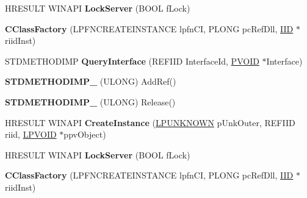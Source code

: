 \begin{DoxyCompactItemize}
\item 
\mbox{\label{class_c_class_factory_ab456aeb3f6ba2d246532a370b69ee471}} 
H\+R\+E\+S\+U\+LT W\+I\+N\+A\+PI {\bfseries Lock\+Server} (B\+O\+OL f\+Lock)
\item 
\mbox{\label{class_c_class_factory_ab0b65f2f3ae9421cc7a8d67962920bc5}} 
{\bfseries C\+Class\+Factory} (L\+P\+F\+N\+C\+R\+E\+A\+T\+E\+I\+N\+S\+T\+A\+N\+CE lpfn\+CI, P\+L\+O\+NG pc\+Ref\+Dll, \hyperlink{struct___i_i_d}{I\+ID} $\ast$riid\+Inst)
\item 
\mbox{\label{class_c_class_factory_a3521365dd055a10b8ff989c16a42bd8f}} 
S\+T\+D\+M\+E\+T\+H\+O\+D\+I\+MP {\bfseries Query\+Interface} (R\+E\+F\+I\+ID Interface\+Id, \hyperlink{interfacevoid}{P\+V\+O\+ID} $\ast$Interface)
\item 
\mbox{\label{class_c_class_factory_a769e4e226363663e0854552a3bda45cc}} 
{\bfseries S\+T\+D\+M\+E\+T\+H\+O\+D\+I\+M\+P\+\_\+} (U\+L\+O\+NG) Add\+Ref()
\item 
\mbox{\label{class_c_class_factory_ace20a6d5768cbf817b952ff32d0ec9e5}} 
{\bfseries S\+T\+D\+M\+E\+T\+H\+O\+D\+I\+M\+P\+\_\+} (U\+L\+O\+NG) Release()
\item 
\mbox{\label{class_c_class_factory_a3c4ccb9f496a79b2fd37418c928ada06}} 
H\+R\+E\+S\+U\+LT W\+I\+N\+A\+PI {\bfseries Create\+Instance} (\hyperlink{interface_i_unknown}{L\+P\+U\+N\+K\+N\+O\+WN} p\+Unk\+Outer, R\+E\+F\+I\+ID riid, \hyperlink{interfacevoid}{L\+P\+V\+O\+ID} $\ast$ppv\+Object)
\item 
\mbox{\label{class_c_class_factory_ab456aeb3f6ba2d246532a370b69ee471}} 
H\+R\+E\+S\+U\+LT W\+I\+N\+A\+PI {\bfseries Lock\+Server} (B\+O\+OL f\+Lock)
\item 
\mbox{\label{class_c_class_factory_ab0b65f2f3ae9421cc7a8d67962920bc5}} 
{\bfseries C\+Class\+Factory} (L\+P\+F\+N\+C\+R\+E\+A\+T\+E\+I\+N\+S\+T\+A\+N\+CE lpfn\+CI, P\+L\+O\+NG pc\+Ref\+Dll, \hyperlink{struct___i_i_d}{I\+ID} $\ast$riid\+Inst)
\end{DoxyCompactItemize}
